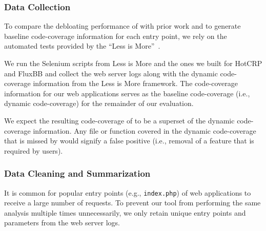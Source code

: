 \subsubsection*{Data Collection} 
To compare the debloating performance of \animatedead{} with prior work and to generate baseline code-coverage information for each entry point, we rely on the automated tests provided by the ``Less is More''~\cite{azad2019less}. 

We run the Selenium scripts from Less is More and the ones we built for HotCRP and FluxBB and collect the web server logs along with the dynamic code-coverage information from the Less is More framework. 
The code-coverage information for our web applications serves as the baseline code-coverage (i.e., dynamic code-coverage) for the remainder of our evaluation. 

We expect the resulting code-coverage of \animatedead{} to be a superset of the dynamic code-coverage information. 
Any file or function covered in the dynamic code-coverage that is missed by \animatedead{} would signify a false positive (i.e., removal of a feature that is required by users). 

\subsubsection*{Data Cleaning and Summarization} 
It is common for popular entry points (e.g., \texttt{index.php}) of web applications to receive a large number of requests. 
To prevent our tool from performing the same analysis multiple times unnecessarily, we only retain unique entry points and parameters from the web server logs. 

